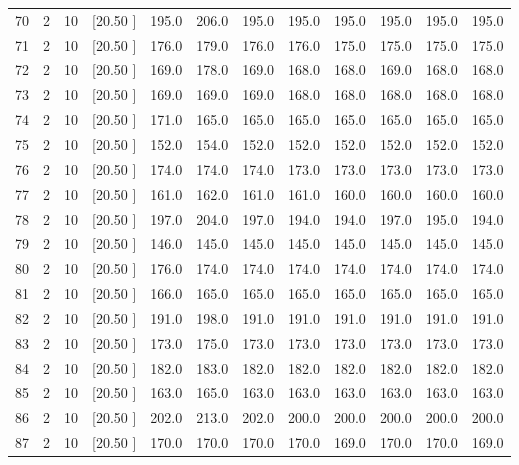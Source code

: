 \documentclass[12pt,a4paper]{article}
\begin{document}
\begin{center}
{\begin{tabular}{r r r r r r r r r r r r}
  70&  2& 10&[20.50     ]&   195.0&   206.0&   195.0&   195.0&   195.0&   195.0&   195.0&   195.0\\[-0.02in]
  71&  2& 10&[20.50     ]&   176.0&   179.0&   176.0&   176.0&   175.0&   175.0&   175.0&   175.0\\[-0.02in]
  72&  2& 10&[20.50     ]&   169.0&   178.0&   169.0&   168.0&   168.0&   169.0&   168.0&   168.0\\[-0.02in]
  73&  2& 10&[20.50     ]&   169.0&   169.0&   169.0&   168.0&   168.0&   168.0&   168.0&   168.0\\[-0.02in]
  74&  2& 10&[20.50     ]&   171.0&   165.0&   165.0&   165.0&   165.0&   165.0&   165.0&   165.0\\[-0.02in]
  75&  2& 10&[20.50     ]&   152.0&   154.0&   152.0&   152.0&   152.0&   152.0&   152.0&   152.0\\[-0.02in]
  76&  2& 10&[20.50     ]&   174.0&   174.0&   174.0&   173.0&   173.0&   173.0&   173.0&   173.0\\[-0.02in]
  77&  2& 10&[20.50     ]&   161.0&   162.0&   161.0&   161.0&   160.0&   160.0&   160.0&   160.0\\[-0.02in]
  78&  2& 10&[20.50     ]&   197.0&   204.0&   197.0&   194.0&   194.0&   197.0&   195.0&   194.0\\[-0.02in]
  79&  2& 10&[20.50     ]&   146.0&   145.0&   145.0&   145.0&   145.0&   145.0&   145.0&   145.0\\[-0.02in]
  80&  2& 10&[20.50     ]&   176.0&   174.0&   174.0&   174.0&   174.0&   174.0&   174.0&   174.0\\[-0.02in]
  81&  2& 10&[20.50     ]&   166.0&   165.0&   165.0&   165.0&   165.0&   165.0&   165.0&   165.0\\[-0.02in]
  82&  2& 10&[20.50     ]&   191.0&   198.0&   191.0&   191.0&   191.0&   191.0&   191.0&   191.0\\[-0.02in]
  83&  2& 10&[20.50     ]&   173.0&   175.0&   173.0&   173.0&   173.0&   173.0&   173.0&   173.0\\[-0.02in]
  84&  2& 10&[20.50     ]&   182.0&   183.0&   182.0&   182.0&   182.0&   182.0&   182.0&   182.0\\[-0.02in]
  85&  2& 10&[20.50     ]&   163.0&   165.0&   163.0&   163.0&   163.0&   163.0&   163.0&   163.0\\[-0.02in]
  86&  2& 10&[20.50     ]&   202.0&   213.0&   202.0&   200.0&   200.0&   200.0&   200.0&   200.0\\[-0.02in]
  87&  2& 10&[20.50     ]&   170.0&   170.0&   170.0&   170.0&   169.0&   170.0&   170.0&   169.0\\[-0.02in]

\end{tabular}}
\end{center}
\end{document}
